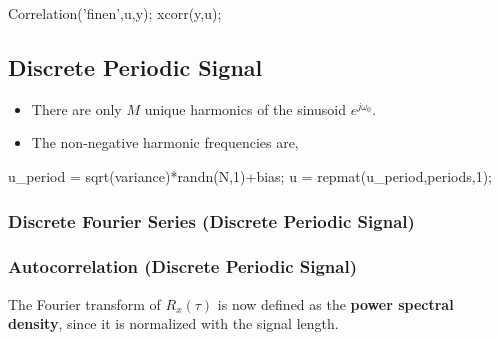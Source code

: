 \documentclass[10pt,a4paper]{scrartcl}
\begin{document}
\begin{multicols*}{2}
\begin{TPMatlab}
Correlation('finen',u,y); %
xcorr(y,u); %
\end{TPMatlab}

\subsection{Discrete Periodic Signal}



\begin{itemize}
\item There are only $M$ unique harmonics of the sinusoid $e^{j\omega_0}$.
\item The non-negative harmonic frequencies are,

\end{itemize}

\begin{TPMatlab}
u_period = sqrt(variance)*randn(N,1)+bias;
u = repmat(u_period,periods,1);
\end{TPMatlab}

\subsubsection{Discrete Fourier Series (Discrete Periodic Signal)}



\subsubsection{Autocorrelation (Discrete Periodic Signal)}


The Fourier transform of $R_x(\tau)$ is now defined as the \textbf{power spectral density}, since it is normalized with the signal length.



\end{multicols*}
\end{document}
